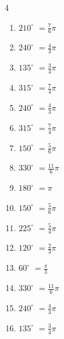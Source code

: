 \begin{multicols}{4}
\begin{enumerate}
  \item $\displaystyle 210^{\circ}$
        $\displaystyle =\frac{7}{6}\pi$

  \item $\displaystyle 240^{\circ}$
        $\displaystyle =\frac{4}{3}\pi$

  \item $\displaystyle 135^{\circ}$
        $\displaystyle =\frac{3}{4}\pi$

  \item $\displaystyle 315^{\circ}$
        $\displaystyle =\frac{7}{4}\pi$

  \item $\displaystyle 240^{\circ}$
        $\displaystyle =\frac{4}{3}\pi$

  \item $\displaystyle 315^{\circ}$
        $\displaystyle =\frac{7}{4}\pi$

  \item $\displaystyle 150^{\circ}$
        $\displaystyle =\frac{5}{6}\pi$

  \item $\displaystyle 330^{\circ}$
        $\displaystyle =\frac{11}{6}\pi$

  \item $\displaystyle 180^{\circ}$
        $\displaystyle =\pi$

  \item $\displaystyle 150^{\circ}$
        $\displaystyle =\frac{5}{6}\pi$

  \item $\displaystyle 225^{\circ}$
        $\displaystyle =\frac{5}{4}\pi$

  \item $\displaystyle 120^{\circ}$
        $\displaystyle =\frac{2}{3}\pi$

\columnbreak %

\resetques

  \item $\displaystyle 60^{\circ}$
        $\displaystyle =\frac{\pi}{3}$

  \item $\displaystyle 330^{\circ}$
        $\displaystyle =\frac{11}{6}\pi$

  \item $\displaystyle 240^{\circ}$
        $\displaystyle =\frac{4}{3}\pi$

  \item $\displaystyle 135^{\circ}$
        $\displaystyle =\frac{3}{4}\pi$


\end{enumerate}
\end{multicols}
